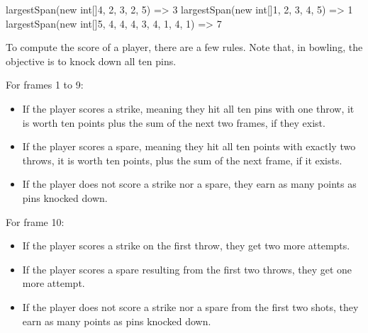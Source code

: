 
\begin{verbnobox}[\small]
largestSpan(new int[]{4, 2, 3, 2, 5})             => 3
largestSpan(new int[]{1, 2, 3, 4, 5})             => 1
largestSpan(new int[]{5, 4, 4, 4, 3, 4, 1, 4, 1}) => 7
\end{verbnobox} 


To compute the score of a player, there are a few rules. Note that, in bowling, the objective is to knock down all ten pins.

For frames 1 to 9:
\begin{itemize}
    \item If the player scores a strike, meaning they hit all ten pins with one throw, it is worth ten points plus the sum of the next two frames, if they exist.
    \item If the player scores a spare, meaning they hit all ten points with exactly two throws, it is worth ten points, plus the sum of the next frame, if it exists.
    \item If the player does not score a strike nor a spare, they earn as many points as pins knocked down.
\end{itemize}

For frame 10:
\begin{itemize}
    \item If the player scores a strike on the first throw, they get two more attempts.
    \item If the player scores a spare resulting from the first two throws, they get one more attempt.
    \item If the player does not score a strike nor a spare from the first two shots, they earn as many points as pins knocked down.
\end{itemize}

